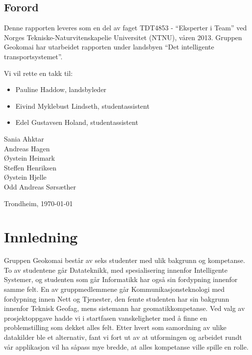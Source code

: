 \documentclass[a4paper,norsk,oneside]{book}
\newcommand{\thesisAuthor}{Sania Ahktar\\Andreas Hagen\\Øystein Heimark\\Steffen Henriksen\\Øystein Hjelle\\Odd Andreas Sørsæther}
\begin{document}



\clearpage

\section*{Forord}



\vspace{1cm}

Denne rapporten leveres som en del av faget TDT4853 - “Eksperter i Team” ved Norges Tekniske-Naturvitenskapelie Universitet (NTNU), våren 2013. Gruppen Geokomai har utarbeidet rapporten under landsbyen “Det intelligente transportsystemet”. 

Vi vil rette en takk til:
\begin{itemize}	
\item Pauline Haddow, landsbyleder
\item Eivind Myklebust Lindseth, studentassistent
\item Edel Gustavsen Holand, studentassistent
\end {itemize}




\vfill

\hfill \thesisAuthor

\hfill Trondheim, \today

\clearpage

\tableofcontents

\listoffigures


\mainmatter

\chapter{Innledning}
\label{cha:Introduction}
Gruppen Geokomai består av seks studenter med ulik bakgrunn og kompetanse. To av studentene går Datateknikk, med spesialisering innenfor Intelligente Systemer, og studenten som går Informatikk har også sin fordypning innenfor samme felt. En av gruppmedlemmene 
går Kommunikasjonsteknologi med fordypning innen Nett og Tjenester, den femte studenten har sin bakgrunn innenfor Teknisk Geofag, mens sistemann har geomatikkompetanse. 
Ved valg av prosjektoppgave hadde vi i startfasen vanskeligheter med å finne en problemstilling som dekket alles felt. Etter hvert som samordning av ulike datakilder ble et alternativ, fant vi fort ut av at utformingen og arbeidet rundt vår applikasjon vil ha såpass mye bredde, at alles kompetanse ville spille en rolle.
\end{document}
